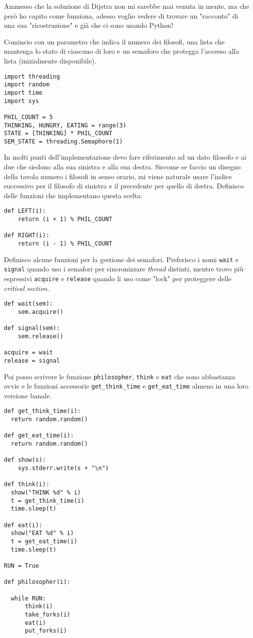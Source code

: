 \documentclass{article}
\begin{document}
Ammesso che la soluzione di Dijstra non mi sarebbe mai venuta in
mente, ma che però ho capito come funziona, adesso voglio vedere di
trovare un "racconto" di una sua "ricostruzione" e già che ci sono
usando Python!

Comincio con un parametro che indica il numero dei filosofi, una
lista che mantenga lo stato di ciascuno di loro e un semaforo che
protegga l'accesso alla lista (inizialmente disponibile).
\begin{verbatim}
import threading
import random
import time
import sys

PHIL_COUNT = 5
THINKING, HUNGRY, EATING = range(3)
STATE = [THINKING] * PHIL_COUNT
SEM_STATE = threading.Semaphore(1)
\end{verbatim}

In molti punti dell'implementazione devo fare riferimento ad un dato
filosofo e ai due che siedono alla sua sinistra e alla sua destra.
Siccome se faccio un disegno della tavola numero i filosofi in senso
orario, mi viene naturale usare l'indice successivo per il filosofo
di sinistra e il precedente per quello di destra.  Definisco delle
funzioni che implementano questa scelta:
\begin{verbatim}
def LEFT(i):
    return (i + 1) % PHIL_COUNT

def RIGHT(i):
    return (i - 1) % PHIL_COUNT
\end{verbatim}

Definisco alcune funzioni per la gestione dei semafori.  Preferisco
i nomi \texttt{wait} e \texttt{signal} quando uso i semafori per sincronizzare
\emph{thread} distinti, mentre trovo più espressivi \texttt{acquire} e \texttt{release}
quando li uso come "lock" per proteggere delle \emph{critical section}.
\begin{verbatim}
def wait(sem):
    sem.acquire()

def signal(sem):
    sem.release()

acquire = wait
release = signal
\end{verbatim}

Poi posso scrivere le funzione \texttt{philosopher}, \texttt{think} e \texttt{eat} che
sono abbastanza ovvie e le funzioni accessorie \texttt{get\_think\_time} e
\texttt{get\_eat\_time} almeno in una loro versione banale.
\begin{verbatim}
def get_think_time(i):
  return random.random()

def get_eat_time(i):
  return random.random()

def show(s):
    sys.stderr.write(s + "\n")

def think(i):
  show("THINK %d" % i)
  t = get_think_time(i)
  time.sleep(t)

def eat(i):
  show("EAT %d" % i)
  t = get_eat_time(i)
  time.sleep(t)

RUN = True

def philosopher(i):

  while RUN:
      think(i)
      take_forks(i)
      eat(i)
      put_forks(i)
\end{verbatim}
\end{document}
